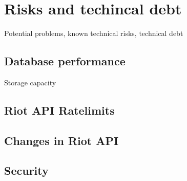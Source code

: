 \section{Risks and techincal debt}
Potential problems, known technical risks, technical debt

\subsection{Database performance}
Storage capacity

\subsection{Riot API Ratelimits}

\subsection{Changes in Riot API}

\subsection{Security}